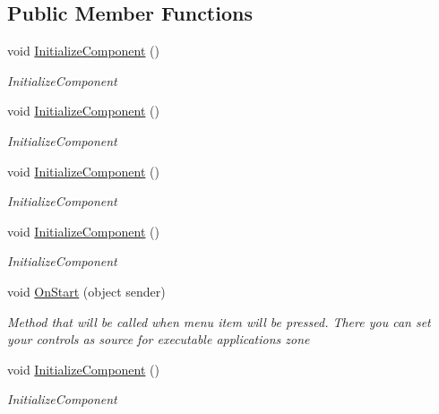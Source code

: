 \subsection*{Public Member Functions}
\begin{DoxyCompactItemize}
\item 
void \mbox{\hyperlink{class_teacher_handbook_1_1_plugins_1_1_schedule_1_1_schedule_a4e0847c918304d0ce088671e13e8f9a6}{Initialize\+Component}} ()
\begin{DoxyCompactList}\small\item\em Initialize\+Component \end{DoxyCompactList}\item 
void \mbox{\hyperlink{class_teacher_handbook_1_1_plugins_1_1_schedule_1_1_schedule_a4e0847c918304d0ce088671e13e8f9a6}{Initialize\+Component}} ()
\begin{DoxyCompactList}\small\item\em Initialize\+Component \end{DoxyCompactList}\item 
void \mbox{\hyperlink{class_teacher_handbook_1_1_plugins_1_1_schedule_1_1_schedule_a4e0847c918304d0ce088671e13e8f9a6}{Initialize\+Component}} ()
\begin{DoxyCompactList}\small\item\em Initialize\+Component \end{DoxyCompactList}\item 
void \mbox{\hyperlink{class_teacher_handbook_1_1_plugins_1_1_schedule_1_1_schedule_a4e0847c918304d0ce088671e13e8f9a6}{Initialize\+Component}} ()
\begin{DoxyCompactList}\small\item\em Initialize\+Component \end{DoxyCompactList}\item 
void \mbox{\hyperlink{class_teacher_handbook_1_1_plugins_1_1_schedule_1_1_schedule_a8f74818aad2b85eea41959b41e4572bd}{On\+Start}} (object sender)
\begin{DoxyCompactList}\small\item\em Method that will be called when menu item will be pressed. There you can set your controls as source for executable application\textquotesingle{}s zone \end{DoxyCompactList}\item 
void \mbox{\hyperlink{class_teacher_handbook_1_1_plugins_1_1_schedule_1_1_schedule_a4e0847c918304d0ce088671e13e8f9a6}{Initialize\+Component}} ()
\begin{DoxyCompactList}\small\item\em Initialize\+Component \end{DoxyCompactList}\end{DoxyCompactItemize}
